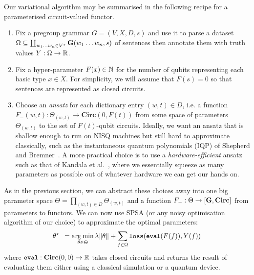 Our variational algorithm may be summarised in the following recipe for a parameterised circuit-valued functor.
\begin{enumerate}
\item Fix a pregroup grammar $G = (V, X, D, s)$ and use it to parse a dataset $\Omega \subseteq \coprod_{w_1 \dots w_n \in V^\star} \mathbf{G}(w_1 \dots w_n, s)$ of sentences then annotate them with truth values $Y : \Omega \to \mathbb{R}$.
\item Fix a hyper-parameter $F(x) \in \mathbb{N}$ for the number of qubits representing each basic type $x \in X$.
For simplicity, we will assume that $F(s) = 0$ so that sentences are represented as closed circuits.
\item Choose an \emph{ansatz} for each dictionary entry $(w, t) \in D$, i.e. a function $F_-(w, t) : \Theta_{(w, t)} \to \mathbf{Circ}(0, F(t))$ from some space of parameters $\Theta_{(w, t)}$ to the set of $F(t)$-qubit circuits.
Ideally, we want an ansatz that is shallow enough to run on NISQ machines but still hard to approximate classically, such as the instantaneous quantum polynomials (IQP) of Shepherd and Bremner~\cite{ShepherdBremner09}.
A more practical choice is to use a \emph{hardware-efficient} ansatz such as that of Kandala et al.~\cite{KandalaEtAl17}, where we essentially squeeze as many parameters as possible out of whatever hardware we can get our hands on.
\end{enumerate}
As in the previous section, we can abstract these choices away into one big parameter space $\Theta = \prod_{(w, t) \in D} \Theta_{(w, t)}$ and a function $F_- : \Theta \to [\mathbf{G}, \mathbf{Circ}]$ from parameters to functors.
We can now use SPSA (or any noisy optimisation algorithm of our choice) to approximate the optimal parameters:
$$\theta^\star \enspace = \operatorname*{arg\,min}_{\theta \in \Theta}
\lambda \lVert \theta \rVert + \sum_{f \in \Omega} \mathtt{loss}(\mathtt{eval}(F(f)), Y(f))$$
where $\mathtt{eval} : \mathbf{Circ}(0, 0) \to \mathbb{R}$ takes closed circuits and returns the result of evaluating them either using a classical simulation or a quantum device.

